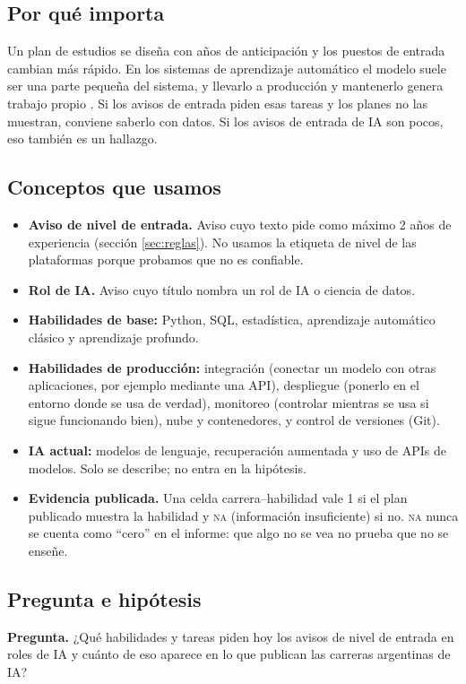 \documentclass[11pt,a4paper]{article}
\newcommand{\NA}{\textsc{na}}
\begin{document}
\subsection{Por qué importa}
Un plan de estudios se diseña con años de anticipación y los puestos de entrada cambian más rápido. En los sistemas de aprendizaje automático el modelo suele ser una parte pequeña del sistema, y llevarlo a producción y mantenerlo genera trabajo propio \cite{sculley2015,paleyes2022}. Si los avisos de entrada piden esas tareas y los planes no las muestran, conviene saberlo con datos. Si los avisos de entrada de IA son pocos, eso también es un hallazgo.

\subsection{Conceptos que usamos}
\begin{itemize}
\item \textbf{Aviso de nivel de entrada.} Aviso cuyo texto pide como máximo 2 años de experiencia (sección \ref{sec:reglas}). No usamos la etiqueta de nivel de las plataformas porque probamos que no es confiable.
\item \textbf{Rol de IA.} Aviso cuyo título nombra un rol de IA o ciencia de datos.
\item \textbf{Habilidades de base:} Python, SQL, estadística, aprendizaje automático clásico y aprendizaje profundo.
\item \textbf{Habilidades de producción:} integración (conectar un modelo con otras aplicaciones, por ejemplo mediante una API), despliegue (ponerlo en el entorno donde se usa de verdad), monitoreo (controlar mientras se usa si sigue funcionando bien), nube y contenedores, y control de versiones (Git).
\item \textbf{IA actual:} modelos de lenguaje, recuperación aumentada y uso de APIs de modelos. Solo se describe; no entra en la hipótesis.
\item \textbf{Evidencia publicada.} Una celda carrera--habilidad vale 1 si el plan publicado muestra la habilidad y \NA{} (información insuficiente) si no. \NA{} nunca se cuenta como ``cero'' en el informe: que algo no se vea no prueba que no se enseñe.
\end{itemize}

\subsection{Pregunta e hipótesis}
\textbf{Pregunta.} ¿Qué habilidades y tareas piden hoy los avisos de nivel de entrada en roles de IA y cuánto de eso aparece en lo que publican las carreras argentinas de IA?
\end{document}

